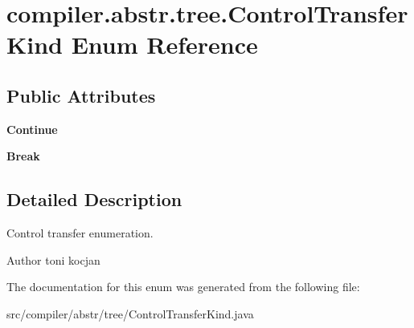 \hypertarget{enumcompiler_1_1abstr_1_1tree_1_1_control_transfer_kind}{}\section{compiler.\+abstr.\+tree.\+Control\+Transfer\+Kind Enum Reference}
\label{enumcompiler_1_1abstr_1_1tree_1_1_control_transfer_kind}
\subsection*{Public Attributes}
\begin{DoxyCompactItemize}
\item 
\mbox{\label{enumcompiler_1_1abstr_1_1tree_1_1_control_transfer_kind_ac659f7e0c7ed9fcfcfd245e32fc8d358}} 
{\bfseries Continue}
\item 
\mbox{\label{enumcompiler_1_1abstr_1_1tree_1_1_control_transfer_kind_ac4a6ea9fa806922fe35161e1b8e7590a}} 
{\bfseries Break}
\end{DoxyCompactItemize}


\subsection{Detailed Description}
Control transfer enumeration. \begin{DoxyAuthor}{Author}
toni kocjan 
\end{DoxyAuthor}


The documentation for this enum was generated from the following file\+:\begin{DoxyCompactItemize}
\item 
src/compiler/abstr/tree/Control\+Transfer\+Kind.\+java\end{DoxyCompactItemize}
